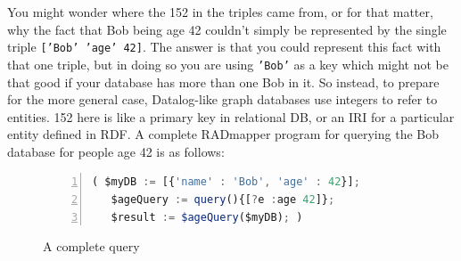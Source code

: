 \documentclass[10pt,letterpaper]{article} %
\newcommand{\stt}[1]{\texttt{#1}} %
\begin{document}
You might wonder where the 152 in the triples came from, or for that matter, why the fact that Bob being age 42 couldn't
simply be represented by the single triple \stt{['Bob' 'age' 42]}.
The answer is that you could represent this fact with that one triple, but in doing so you are using \stt{'Bob'} as a key
which might not be that good if your database has more than one Bob in it.
So instead, to prepare for the more general case, Datalog-like graph databases use integers to refer to entities.
152 here is like a primary key in relational DB, or an IRI for a particular entity defined in RDF.
A complete RADmapper program for querying the Bob database for people age 42 is as follows:

\begin{figure}[H]
  \caption{A complete query}
  \label{code:bob-age}
\begin{lstlisting}[language=JavaScript,numberstyle=\scriptsize,basicstyle=\ttfamily\scriptsize,numbers=left,stepnumber=1,breaklines=true]
 ( $myDB := [{'name' : 'Bob', 'age' : 42}];
   $ageQuery := query(){[?e :age 42]};
   $result := $ageQuery($myDB); )
\end{lstlisting}
\end{figure} \vspace{-2em}

\end{document}
